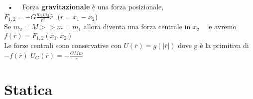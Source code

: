 \documentclass{article}
\begin{document}
%
\ • \ \ Forza \textbf{gravitazionale} è una forza posizionale, $\overline{F}_{1,2} = -G\frac{m_1m_2}{r^2}\hat{r} \ \ \ (\overline{r}=\overline{x}_1 - \overline{x}_2$)\\
\phantom{} \hspace{0.18in} Se $m_2=M>>m=m_1$ allora diventa una forza centrale in $\overline{x}_2$ \ \ e avremo $f(\overline{r}) = \overline{F}_{1,2}(\overline{x}_1 , \overline{x}_2)$\\
\phantom{} \hspace{0.18in} Le forze centrali sono conservative con $U(\overline{r})=g(|\overline{r}|)$ dove g è la primitiva di $-f(\overline{r})$ \hspace{0.12in} $U_G(\overline{r})= -\frac{GMm}{r}$\\






\section{Statica}
%
%
%
\end{document}
